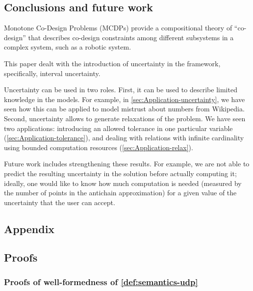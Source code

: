 \subsection{Conclusions and future work}

Monotone Co-Design Problems (MCDPs) provide a compositional theory
of ``co-design'' that describes co-design constraints among different
subsystems in a complex system, such as a robotic system.

This paper dealt with the introduction of uncertainty in the framework,
specifically, interval uncertainty.

Uncertainty can be used in two roles. First, it can be used to describe
limited knowledge in the models. For example, in \cref{sec:Application-uncertainty},
we have seen how this can be applied to model mistrust about numbers
from Wikipedia. Second, uncertainty allows to generate relaxations
of the problem. We have seen two applications: introducing an allowed
tolerance in one particular variable (\cref{sec:Application-tolerance}),
and dealing with relations with infinite cardinality using bounded
computation resources (\cref{sec:Application-relax}).

Future work includes strengthening these results. For example, we
are not able to predict the resulting uncertainty in the solution
before actually computing it; ideally, one would like to know how
much computation is needed (measured by the number of points in the
antichain approximation) for a given value of the uncertainty that
the user can accept.

{

\footnotesize



\setcounter{page}{1}


\printbibliography

}

\clearpage

\appendix

\subsection{{\normalsize{}Appendix}}

\subsection{Proofs}

\subsubsection{Proofs of well-formedness of \cref{def:semantics-udp}}

